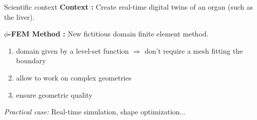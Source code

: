 \begin{frame}{Scientific context}
    \textbf{Context :} Create real-time digital twins of an organ (such as the liver).

    \textbf{$\phi$-FEM Method :} New fictitious domain finite element method.

    \begin{enumerate}[\ding{217}]
        \item domain given by a level-set function $\Rightarrow$ don't require a mesh fitting the boundary 
        \item allow to work on complex geometries 
        \item ensure geometric quality 
    \end{enumerate}
    
    \begin{center}
    \end{center}	

    \textit{Practical case:} Real-time simulation, shape optimization...
\end{frame}

